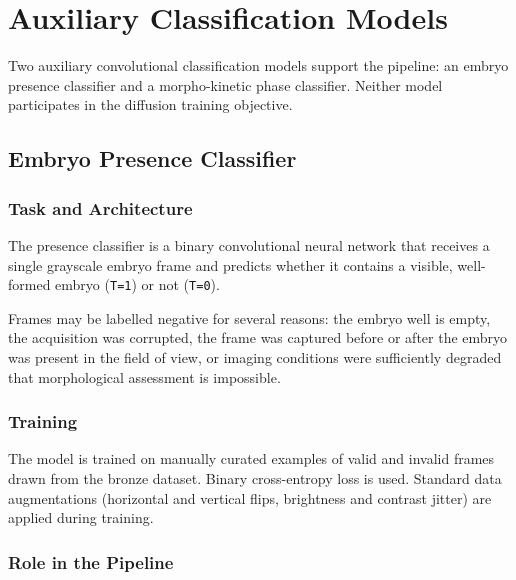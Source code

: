 \documentclass[12pt, a4paper, twoside]{report}
\begin{document}
\chapter{Auxiliary Classification Models}
\label{chap:auxiliary}

Two auxiliary convolutional classification models support the pipeline:
an embryo presence classifier and a morpho-kinetic phase classifier.
Neither model participates in the diffusion training objective.

\section{Embryo Presence Classifier}
\label{sec:presence_classifier}

\subsection{Task and Architecture}
\label{ssec:presence_arch}

The presence classifier is a binary convolutional neural network that receives
a single grayscale embryo frame and predicts whether it contains a visible,
well-formed embryo (\texttt{T=1}) or not (\texttt{T=0}).

Frames may be labelled negative for several reasons: the embryo well is empty,
the acquisition was corrupted, the frame was captured before or after the
embryo was present in the field of view, or imaging conditions were
sufficiently degraded that morphological assessment is impossible.

\subsection{Training}
\label{ssec:presence_training}

The model is trained on manually curated examples of valid and invalid frames
drawn from the bronze dataset.
Binary cross-entropy loss is used.
Standard data augmentations (horizontal and vertical flips, brightness and
contrast jitter) are applied during training.

\subsection{Role in the Pipeline}
\label{ssec:presence_role}
\end{document}
